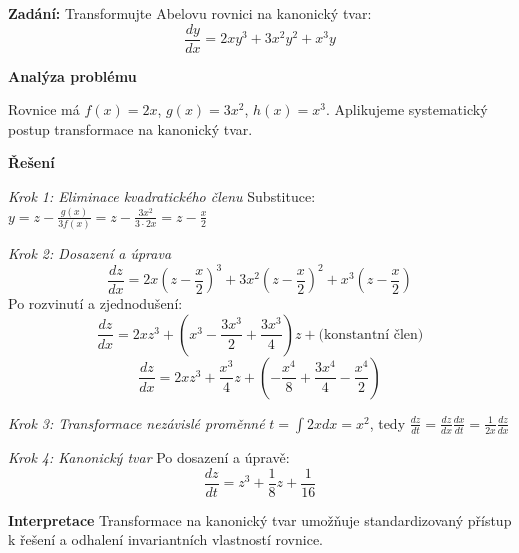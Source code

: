 \begin{example}
\label{ex:abel-kanonicky}

\noindent\textbf{Zadání:} Transformujte Abelovu rovnici na kanonický tvar:
\[
\frac{dy}{dx} = 2x y^3 + 3x^2 y^2 + x^3 y
\]

\vspace{1.5\baselineskip}

\noindent\textbf{Analýza problému}

Rovnice má $f(x) = 2x$, $g(x) = 3x^2$, $h(x) = x^3$. Aplikujeme systematický postup transformace na kanonický tvar.

\vspace{1.5\baselineskip}

\noindent\textbf{Řešení}

\noindent\textit{Krok 1: Eliminace kvadratického členu}
Substituce: $y = z - \frac{g(x)}{3f(x)} = z - \frac{3x^2}{3\cdot 2x} = z - \frac{x}{2}$

\vspace{1\baselineskip}

\noindent\textit{Krok 2: Dosazení a úprava}
\[
\frac{dz}{dx} = 2x\left(z - \frac{x}{2}\right)^3 + 3x^2\left(z - \frac{x}{2}\right)^2 + x^3\left(z - \frac{x}{2}\right)
\]
Po rozvinutí a zjednodušení:
\[
\frac{dz}{dx} = 2x z^3 + \left(x^3 - \frac{3x^3}{2} + \frac{3x^3}{4}\right)z + \text{(konstantní člen)}
\]
\[
\frac{dz}{dx} = 2x z^3 + \frac{x^3}{4}z + \left(-\frac{x^4}{8} + \frac{3x^4}{4} - \frac{x^4}{2}\right)
\]

\vspace{1\baselineskip}

\noindent\textit{Krok 3: Transformace nezávislé proměnné}
$t = \int 2x dx = x^2$, tedy $\frac{dz}{dt} = \frac{dz}{dx}\frac{dx}{dt} = \frac{1}{2x}\frac{dz}{dx}$

\vspace{1\baselineskip}

\noindent\textit{Krok 4: Kanonický tvar}
Po dosazení a úpravě:
\[
\frac{dz}{dt} = z^3 + \frac{1}{8}z + \frac{1}{16}
\]

\vspace{1.5\baselineskip}

\noindent\textbf{Interpretace}
Transformace na kanonický tvar umožňuje standardizovaný přístup k řešení a odhalení invariantních vlastností rovnice.

\end{example}

